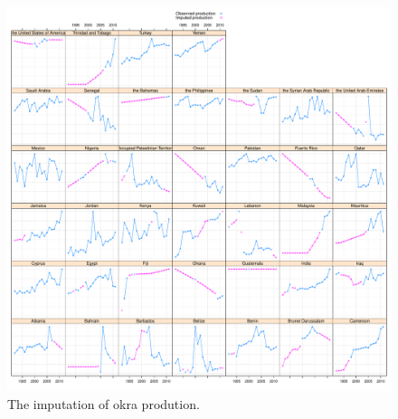 \documentclass[nojss]{jss}\usepackage[]{graphicx}\usepackage[]{color}
\makeatletter
\def\maxwidth{ %
  \ifdim\Gin@nat@width>\linewidth
    \linewidth
  \else
    \Gin@nat@width
  \fi
}
\newenvironment{knitrout}{}{} %
\makeatother
\begin{document}
\begin{knitrout}
\color{fgcolor}\begin{figure}[!ht]


{\centering \includegraphics[width=\maxwidth]{figure/okra-production-imputed} 

}

\caption[The imputation of okra prodution]{The imputation of okra prodution.\label{fig:okra-production-imputed}}
\end{figure}


\end{knitrout}
\end{document}
